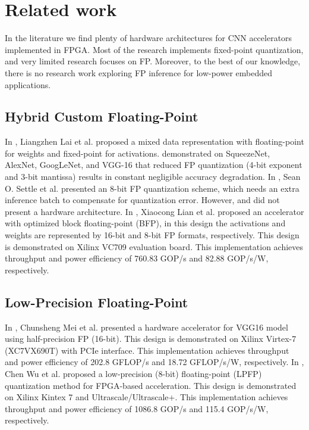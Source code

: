 \section{Related work}
\label{sec:related_work}
In the literature we find plenty of hardware architectures for CNN accelerators implemented in FPGA. Most of the research implements fixed-point quantization, and very limited research focuses on FP. Moreover, to the best of our knowledge, there is no research work exploring FP inference for low-power embedded applications.


\subsection{Hybrid Custom Floating-Point}
In \cite{lai2017deep}, Liangzhen Lai et al. proposed a mixed data representation with floating-point for weights and fixed-point for activations. \cite{lai2017deep} demonstrated on SqueezeNet, AlexNet, GoogLeNet, and VGG-16 that reduced FP quantization (4-bit exponent and 3-bit mantissa) results in constant negligible accuracy degradation. In \cite{settle2018quantizing}, Sean O. Settle et al. presented an 8-bit FP quantization scheme, which needs an extra inference batch to compensate for quantization error. However, \cite{lai2017deep} and \cite{settle2018quantizing} did not present a hardware architecture. In \cite{lian2019high}, Xiaocong Lian et al. proposed an accelerator with optimized block floating-point (BFP), in this design the activations and weights are represented by 16-bit and 8-bit FP formats, respectively. This design is demonstrated on Xilinx VC709 evaluation board. This implementation achieves throughput and power efficiency of 760.83 GOP/s and 82.88 GOP/s/W, respectively.

\subsection{Low-Precision Floating-Point}
In \cite{mei2017200mhz}, Chunsheng Mei et al. presented a hardware accelerator for VGG16 model using half-precision FP (16-bit). This design is demonstrated on Xilinx Virtex-7 (XC7VX690T) with PCIe interface. This implementation achieves throughput and power efficiency of 202.8 GFLOP/s and 18.72 GFLOP/s/W, respectively. In \cite{wu2021low}, Chen Wu et al. proposed a low-precision (8-bit) floating-point (LPFP) quantization method for FPGA-based acceleration. This design is demonstrated on Xilinx Kintex 7 and Ultrascale/Ultrascale+. This implementation achieves throughput and power efficiency of 1086.8 GOP/s and 115.4 GOP/s/W, respectively.


